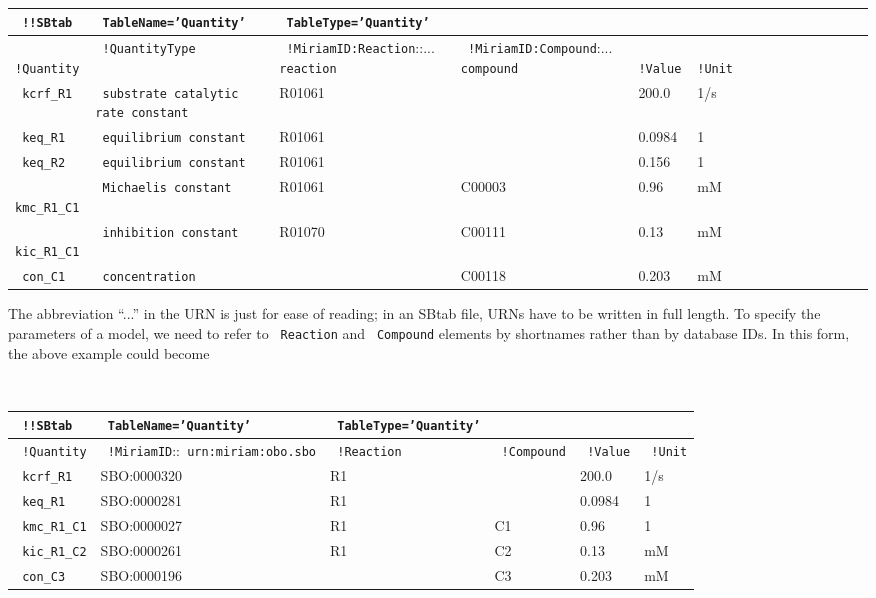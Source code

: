 \documentclass[a4paper]{article}
\newcommand{\tab}[1]{{\texttt{\color{red} #1}}}
\newcommand{\col}[1]{\texttt{\color{blue} #1}}
\newcommand{\defext}[1] {\texttt{\color{lightblue} #1}}
\newcommand{\defint}[1] {\texttt{\color{darkgreen} #1}}
\newcommand{\nick}[1] {\texttt{\color{lila} #1}}
\begin{document}
{\tt \scriptsize
\begin{tabular}{|l|l|l|l|l|l|l|l|l|l|l|l|l|l|l|}
\hline
 \tab{!!SBtab}	& \tab{TableName='Quantity'} & \tab{TableType='Quantity'} & & & \\ \hline\hline
\tab{!Quantity} &  \col{!QuantityType} 	&  \col{!MiriamID:Reaction}::...\defext{reaction} & \col{!MiriamID:Compound}:...\defext{compound} &\defint{!Value} &\col{!Unit} \\ \hline\hline
\nick{kcrf\_R1} & \defext{substrate catalytic rate constant}   	&  R01061 &       & 200.0 & 1/s\\ \hline
\nick{keq\_R1} 	& \defext{equilibrium constant}      &  R01061 &        & 0.0984	& 1 \\ \hline
\nick{keq\_R2} 	& \defext{equilibrium constant}      &  R01061 &        & 0.156	 	& 1 \\ \hline
\nick{kmc\_R1\_C1} & \defext{Michaelis constant}     &  R01061 & C00003 & 0.96  	& mM\\ \hline
\nick{kic\_R1\_C1} & \defext{inhibition constant}    &  R01070 & C00111 & 0.13  	& mM\\ \hline
\nick{con\_C1} 	& \defext{concentration}             &         & C00118 & 0.203 	& mM\\ \hline
\end{tabular}
}

The abbreviation ``...'' in the URN is just for ease of reading; in an
SBtab file, URNs have to be written in full length.  To specify the
parameters of a model, we need to refer to \col{Reaction} and
\col{Compound} elements by shortnames rather
than by database IDs. In this form, the above example  could become\\

 {\tt \small
    \begin{tabular}{|l|l|l|l|l|l|}
\hline
    \tab{!!SBtab} & \tab{TableName='Quantity'} & \tab{TableType='Quantity'} & & & \\
      \hline\hline
      \col{!Quantity} &  \col{!MiriamID}::\defext{urn:miriam:obo.sbo}&  \col{!Reaction} & \col{!Compound} &\defint{!Value}  &\col{!Unit} \\ \hline
      \nick{kcrf\_R1} &  SBO:0000320 &  R1 &        & 200.0  & 1/s\\ \hline
      \nick{keq\_R1}   &  SBO:0000281 &  R1 &        & 0.0984 & 1 \\ \hline
      \nick{kmc\_R1\_C1} &  SBO:0000027 &  R1 & C1 & 0.96   & 1 \\ \hline
      \nick{kic\_R1\_C2} &  SBO:0000261 &  R1 & C2 & 0.13   & mM\\ \hline
      \nick{con\_C3}  &  SBO:0000196 &     & C3 & 0.203  & mM\\
      \hline                                                                               
\end{tabular}
}
\end{document}
